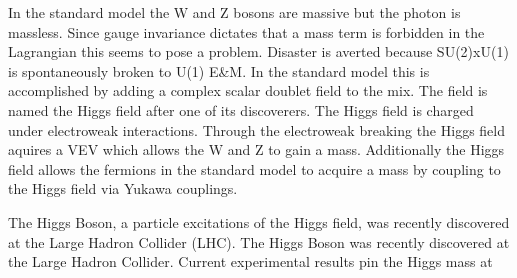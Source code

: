 
In the standard model the W and Z bosons are massive but the photon is massless.
Since gauge invariance dictates that a mass term is forbidden in the Lagrangian this seems to pose a problem.
Disaster is averted because SU(2)xU(1) is spontaneously broken to U(1) E\&M.
In the standard model this is accomplished by adding a complex scalar doublet field to the mix.
The field is named the Higgs field after one of its discoverers.
The Higgs field is charged under electroweak interactions.
Through the electroweak breaking the Higgs field aquires a VEV which allows the W and Z to gain a mass.
Additionally the Higgs field allows the fermions in the standard model to acquire a mass by coupling to the Higgs field via Yukawa couplings.

The Higgs Boson, a particle excitations of the Higgs field, was recently discovered at the Large Hadron Collider (LHC).
The Higgs Boson was recently discovered at the Large Hadron Collider.
Current experimental results pin the Higgs mass at


